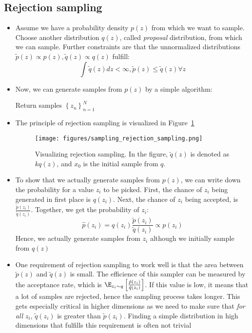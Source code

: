 \subsection{Rejection sampling}
\begin{itemize}
	\item Assume we have a probability density $p(z)$ from which we want to sample. Choose another distribution $q(z)$, called \textit{proposal} distribution, from which we can sample. Further constraints are that the unnormalized distributions $\tilde{p}(z)\propto p(z), \tilde{q}(z)\propto q(z)$ fulfill:
	$$\int \tilde{q}(z)dz < \infty, \tilde{p}(z)\leq \tilde{q}(z) \forall z$$
	\item Now, we can generate samples from $p(z)$ by a simple algorithm:
	\begin{tcolorbox}[colback=white!85!gray,colframe=gray!75!black,title=Pseudocode for rejection sampling]
		\begin{algorithm}[H]
			\SetAlgoLined
			Return samples $\left\{z_n\right\}_{n=1}^{N}$\;
		\end{algorithm}
	\end{tcolorbox}
	\item The principle of rejection sampling is visualized in Figure~\ref{fig:sampling_rejection_sampling}
	\begin{figure}[ht!]
		\centering
		\texttt{[image: figures/sampling\_rejection\_sampling.png]}
		\caption{Visualizing rejection sampling. In the figure, $\tilde{q}(z)$ is denoted as $kq(z)$, and $x_0$ is the initial sample from $q$.}
		\label{fig:sampling_rejection_sampling}
	\end{figure}
	\item To show that we actually generate samples from $p(z)$, we can write down the probability for a value $z_i$ to be picked. First, the chance of $z_i$ being generated in first place is $q(z_i)$. Next, the chance of $z_i$ being accepted, is $\frac{\tilde{p}(z_i)}{\tilde{q}(z_i)}$. Together, we get the probability of $z_i$:
	$$\hat{p}(z_i) = q(z_i)\frac{\tilde{p}(z_i)}{\tilde{q}(z_i)} \propto p(z_i)$$
	Hence, we actually generate samples from $z_i$ although we initially sample from $q(z)$
	\item One requirement of rejection sampling to work well is that the area between $\tilde{p}(z)$ and $\tilde{q}(z)$ is small. The efficience of this sampler can be measured by the acceptance rate, which is $\E_{z_i\sim q}\left[\frac{\tilde{p}(z_i)}{\tilde{q}(z_i)} \right]$. If this value is low, it means that a lot of samples are rejected, hence the sampling process takes longer. This gets especially critical in higher dimensions as we need to make sure that \textit{for all} $z_i$, $\tilde{q}(z_i)$ is greater than $\tilde{p}(z_i)$. Finding a simple distribution in high dimensions that fulfills this requirement is often not trivial
\end{itemize}
